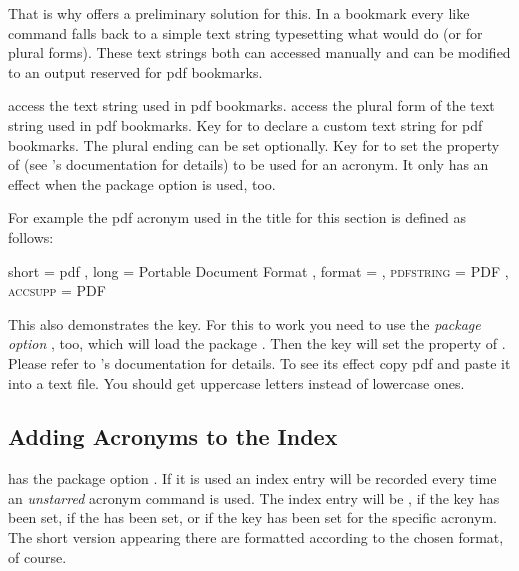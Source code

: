 \documentclass[DIV10,toc=index,toc=bib,hyperfootnotes=false]{cnpkgdoc}
\makeatletter
\newcommand*\sinceversion[1]{%
  \@bsphack
  \marginnote{%
    \footnotesize\sffamily\RaggedRight
    \textcolor{black!75}{Introduced in version~#1}}%
  \@esphack}
\makeatother
\begin{document}
That is why \acro offers a preliminary solution for this. In a bookmark every
 like command falls back to a simple text string typesetting what 
would do (or  for plural forms). These text strings both can accessed
manually and can be modified to an output reserved for \acs{pdf} bookmarks.

\begin{beschreibung}
 \newline
   access the text string used in \acs{pdf} bookmarks.
 \newline
   access the plural form of the text string used in \acs{pdf} bookmarks.
 \newline
   Key for  to declare a custom text string for \acs{pdf}
   bookmarks. The plural ending can be set optionally.
 \newline
   \sinceversion{1.0}Key for  to set the 
   property of  (see 's documentation for details)
   to be used for an acronym. It only has an effect when the package option 
   is used, too.
\end{beschreibung}

For example the \acs{pdf} acronym used in the title for this section is defined
as follows:
\begin{beispiel}
  {
    short     = pdf ,
    long      = Portable Document Format ,
    format    = \scshape ,
    pdfstring = PDF ,
    accsupp   = PDF
  }
\end{beispiel}

This also demonstrates the  key. For this to work you need to use
the \emph{package option} , too, which will load the package
. Then the key  will set the 
property of . Please refer to 's documentation
for details. To see its effect copy \ac{pdf} and paste it into a text file. You
should get uppercase letters instead of lowercase ones.

\subsection{Adding Acronyms to the Index}\label{ssec:index}
\noindent\sinceversion{1.1}\acro has the package option . If it is
used an index entry will be recorded every time an \emph{unstarred} acronym
command is used. The index entry will be , 
if the  key has been set, if the
 has been set, or  if the key  has been
set for the specific acronym. The short version appearing there are formatted
according to the chosen format, of course.
\end{document}
